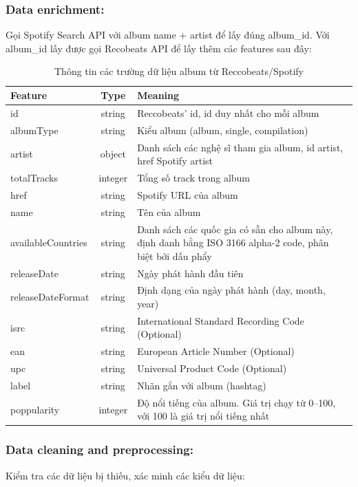 \subsubsection{Data enrichment:}
Gọi Spotify Search API với album name + artist để lấy đúng album\_id. Với album\_id lấy được gọi Recobeats API để lấy thêm các features sau đây:
\begin{table}[h!]
\centering
\renewcommand{\arraystretch}{1.2} %
\begin{tabularx}{\textwidth}{|>{\raggedright\arraybackslash}X|c|>{\raggedright\arraybackslash}X|}
\hline
\textbf{Feature} & \textbf{Type} & \textbf{Meaning} \\
\hline
id & string & Reccobeats’ id, id duy nhất cho mỗi album \\
\hline
albumType & string & Kiểu album (album, single, compilation) \\
\hline
artist & object & Danh sách các nghệ sĩ tham gia album, id artist, href Spotify artist \\
\hline
totalTracks & integer & Tổng số track trong album \\
\hline
href & string & Spotify URL của album \\
\hline
name & string & Tên của album \\
\hline
availableCountries & string & Danh sách các quốc gia có sẵn cho album này, định danh bằng ISO 3166 alpha-2 code, phân biệt bởi dấu phẩy \\
\hline
releaseDate & string & Ngày phát hành đầu tiên \\
\hline
releaseDateFormat & string & Định dạng của ngày phát hành (day, month, year) \\
\hline
isrc & string & {\color[HTML]{1C1E21}International Standard Recording Code (Optional)} \\
\hline
ean & string & {\color[HTML]{1C1E21}European Article Number (Optional)} \\
\hline
upc & string & {\color[HTML]{1C1E21}Universal Product Code (Optional)} \\
\hline
label & string & Nhãn gắn với album (hashtag) \\
\hline
poppularity & integer & Độ nổi tiếng của album. Giá trị chạy từ 0–100, với 100 là giá trị nổi tiếng nhất \\
\hline
\end{tabularx}
\caption{Thông tin các trường dữ liệu album từ Reccobeats/Spotify}
\end{table}

\subsubsection{Data cleaning and preprocessing: }
Kiểm tra các dữ liệu bị thiếu, xác minh các kiểu dữ liệu:

